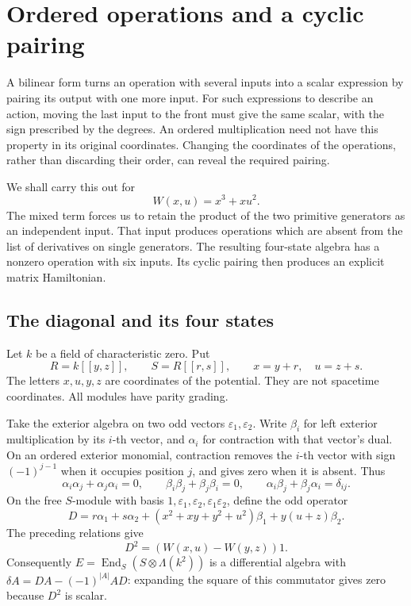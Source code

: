 \chapter{Ordered operations and a cyclic pairing}
\label{chap:cyclic-mixed-diagonal}

A bilinear form turns an operation with several inputs into a scalar
expression by pairing its output with one more input. For such expressions
to describe an action, moving the last input to the front must give the
same scalar, with the sign prescribed by the degrees. An ordered
multiplication need not have this property in its original coordinates.
Changing the coordinates of the operations, rather than discarding their
order, can reveal the required pairing.

We shall carry this out for
\[
 W(x,u)=x^3+xu^2.
\]
The mixed term forces us to retain the product of the two primitive
generators as an independent input. That input produces operations which
are absent from the list of derivatives on single generators. The resulting
four-state algebra has a nonzero operation with six inputs. Its cyclic
pairing then produces an explicit matrix Hamiltonian.

\section{The diagonal and its four states}
\label{sec:cmc-diagonal}

Let \(k\) be a field of characteristic zero. Put
\[
 R=k[[y,z]],\qquad S=R[[r,s]],\qquad x=y+r,\quad u=z+s.
\]
The letters \(x,u,y,z\) are coordinates of the potential. They are not
spacetime coordinates. All modules have parity grading.

Take the exterior algebra on two odd vectors
\(\varepsilon_1,\varepsilon_2\). Write \(\beta_i\) for
left exterior multiplication by its \(i\)-th vector, and \(\alpha_i\)
for contraction with that vector's dual. On an ordered exterior monomial,
contraction removes the \(i\)-th vector with sign \((-1)^{j-1}\) when
it occupies position \(j\), and gives zero when it is absent. Thus
\[
 \alpha_i\alpha_j+\alpha_j\alpha_i=0,\qquad
 \beta_i\beta_j+\beta_j\beta_i=0,\qquad
 \alpha_i\beta_j+\beta_j\alpha_i=\delta_{ij}.
\]
On the free \(S\)-module with basis
\(1,\varepsilon_1,\varepsilon_2,\varepsilon_1\varepsilon_2\), define the odd operator
\[
 D=r\alpha_1+s\alpha_2+
 (x^2+xy+y^2+u^2)\beta_1+y(u+z)\beta_2.
\]
The preceding relations give
\[
 D^2=(W(x,u)-W(y,z))1.
\]
Consequently \(E=\operatorname{End}_S(S\otimes\Lambda(k^2))\) is a
differential algebra with
\(\delta A=DA-(-1)^{|A|}AD\): expanding the square of this
commutator gives zero because \(D^2\) is scalar.

